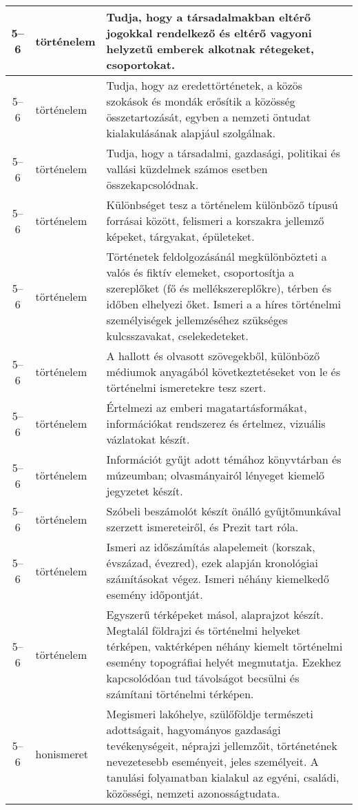 \begin{small}
\begin{longtable}{c | p{2cm} |  p{11cm} }
              5--6 & történelem & Tudja, hogy a társadalmakban eltérő jogokkal rendelkező és eltérő vagyoni helyzetű emberek alkotnak rétegeket, csoportokat. \\ \hline
              5--6 & történelem & Tudja, hogy az eredettörténetek, a közös szokások és mondák erősítik a közösség összetartozását, egyben a nemzeti öntudat kialakulásának alapjául szolgálnak. \\ \hline
              5--6 & történelem & Tudja, hogy a társadalmi, gazdasági, politikai és vallási küzdelmek számos esetben összekapcsolódnak. \\ \hline
              5--6 & történelem & Különbséget tesz a történelem különböző típusú forrásai között, felismeri a korszakra jellemző képeket, tárgyakat, épületeket. \\ \hline
              5--6 & történelem & Történetek feldolgozásánál megkülönbözteti a valós és fiktív elemeket, csoportosítja a szereplőket (fő és mellékszereplőkre), térben és időben elhelyezi őket. Ismeri a a híres történelmi személyiségek jellemzéséhez szükséges kulcsszavakat, cselekedeteket. \\ \hline
              5--6 & történelem & A hallott és olvasott szövegekből, különböző médiumok anyagából következtetéseket von le és történelmi ismeretekre tesz szert. \\ \hline
              5--6 & történelem & Értelmezi az emberi magatartásformákat, információkat rendszerez és értelmez, vizuális vázlatokat készít. \\ \hline
              5--6 & történelem & Információt gyűjt adott témához könyvtárban és múzeumban; olvasmányairól lényeget kiemelő jegyzetet készít. \\ \hline
              5--6 & történelem & Szóbeli beszámolót készít önálló gyűjtőmunkával szerzett ismereteiről, és Prezit tart róla. \\ \hline
              5--6 & történelem & Ismeri az időszámítás alapelemeit (korszak, évszázad, évezred), ezek alapján kronológiai számításokat végez. Ismeri néhány kiemelkedő esemény időpontját. \\ \hline
              5--6 & történelem & Egyszerű térképeket másol, alaprajzot készít. Megtalál földrajzi és történelmi helyeket térképen, vaktérképen néhány kiemelt történelmi esemény topográfiai helyét megmutatja. Ezekhez kapcsolódóan tud távolságot becsülni és számítani történelmi térképen. \\ \hline
              5--6 & honismeret & Megismeri lakóhelye, szülőföldje természeti adottságait, hagyományos gazdasági tevékenységeit, néprajzi jellemzőit, történetének nevezetesebb eseményeit, jeles személyeit. A tanulási folyamatban kialakul az egyéni, családi, közösségi, nemzeti azonosságtudata. \\ \hline

\end{longtable}
\end{small}
